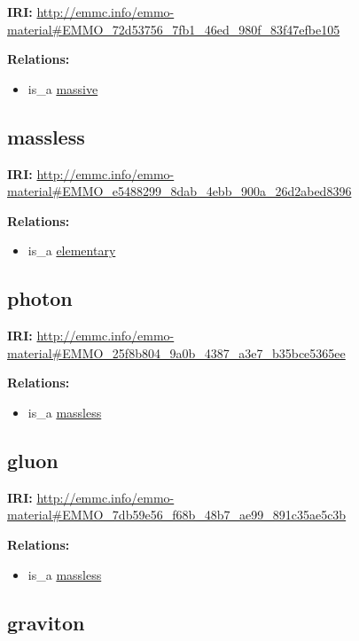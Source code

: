\documentclass[a4paper,]{report}
\providecommand{\tightlist}{%
  \setlength{\itemsep}{0pt}\setlength{\parskip}{0pt}}
\begin{document}
\textbf{IRI:}
\url{http://emmc.info/emmo-material\#EMMO_72d53756_7fb1_46ed_980f_83f47efbe105}

\textbf{Relations:}

\begin{itemize}
\tightlist
\item
  is\_a \protect\hyperlink{massive}{massive}
\end{itemize}

\hypertarget{massless}{%
\subsection{massless}\label{massless}}

\textbf{IRI:}
\url{http://emmc.info/emmo-material\#EMMO_e5488299_8dab_4ebb_900a_26d2abed8396}

\textbf{Relations:}

\begin{itemize}
\tightlist
\item
  is\_a \protect\hyperlink{elementary}{elementary}
\end{itemize}

\hypertarget{photon}{%
\subsection{photon}\label{photon}}

\textbf{IRI:}
\url{http://emmc.info/emmo-material\#EMMO_25f8b804_9a0b_4387_a3e7_b35bce5365ee}

\textbf{Relations:}

\begin{itemize}
\tightlist
\item
  is\_a \protect\hyperlink{massless}{massless}
\end{itemize}

\hypertarget{gluon}{%
\subsection{gluon}\label{gluon}}

\textbf{IRI:}
\url{http://emmc.info/emmo-material\#EMMO_7db59e56_f68b_48b7_ae99_891c35ae5c3b}

\textbf{Relations:}

\begin{itemize}
\tightlist
\item
  is\_a \protect\hyperlink{massless}{massless}
\end{itemize}

\hypertarget{graviton}{%
\subsection{graviton}\label{graviton}}
\end{document}
